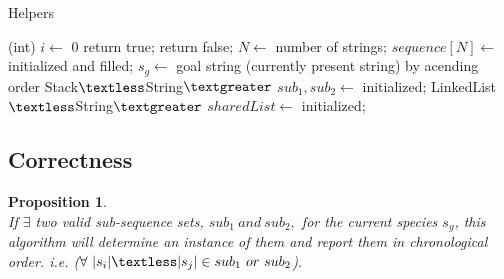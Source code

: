 \documentclass[12pt]{article}
\newtheorem{proposition}[theorem]{Proposition}
\begin{document}
\begin{algorithm}[H]
\caption{Helpers}
\begin{algorithmic}
        \State (int) $i \gets$ 0
                    return true;
                \EndIf
            \EndIf
        \EndFor
        \State return false;
    \EndProcedure
        \State $N \gets$ number of strings; $sequence[N] \gets$ initialized and filled;
        \State $s_g \gets$ goal string (currently present string)
        \State {} by acending order
        \State Stack$\textless$String$\textgreater$ $sub_1, sub_2 \gets$ initialized;
        \State LinkedList$\textless$String$\textgreater$ $sharedList \gets$ initialized;
    \EndProcedure
\end{algorithmic}
\end{algorithm}


\subsection{Correctness}
\begin{proposition}
~ \\ \indent If $\exists$ two valid sub-sequence sets, $sub_1\ and\ sub_2,$ for the current species $s_g$,
this algorithm will determine an instance of them and report them in chronological order. i.e.
($\forall\ |s_i| \textless |s_j| \in sub_1\ or\ sub_2$).
\end{proposition}
\end{document}
